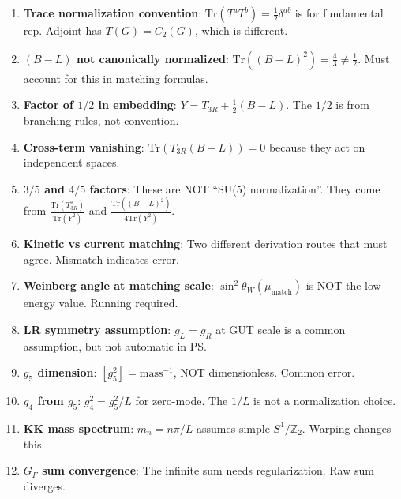 \documentclass[11pt,a4paper]{article}
\begin{document}
\begin{enumerate}[label=\textbf{Trap \arabic*}:]

\item \textbf{Trace normalization convention}:
$\mathrm{Tr}(T^a T^b) = \frac{1}{2}\delta^{ab}$ is for fundamental rep.
Adjoint has $T(G) = C_2(G)$, which is different.

\item \textbf{$(B-L)$ not canonically normalized}:
$\mathrm{Tr}((B-L)^2) = \frac{4}{3} \neq \frac{1}{2}$. Must account for this
in matching formulas.

\item \textbf{Factor of $1/2$ in embedding}:
$Y = T_{3R} + \frac{1}{2}(B-L)$. The $1/2$ is from branching rules, not convention.

\item \textbf{Cross-term vanishing}:
$\mathrm{Tr}(T_{3R} (B-L)) = 0$ because they act on independent spaces.

\item \textbf{$3/5$ and $4/5$ factors}:
These are NOT ``SU(5) normalization''. They come from
$\frac{\mathrm{Tr}(T_{3R}^2)}{\mathrm{Tr}(Y^2)}$ and $\frac{\mathrm{Tr}((B-L)^2)}{4\mathrm{Tr}(Y^2)}$.

\item \textbf{Kinetic vs current matching}:
Two different derivation routes that must agree. Mismatch indicates error.

\item \textbf{Weinberg angle at matching scale}:
$\sin^2\theta_W(\mu_{\text{match}})$ is NOT the low-energy value. Running required.

\item \textbf{LR symmetry assumption}:
$g_L = g_R$ at GUT scale is a common assumption, but not automatic in PS.

\item \textbf{$g_5$ dimension}:
$[g_5^2] = \text{mass}^{-1}$, NOT dimensionless. Common error.

\item \textbf{$g_4$ from $g_5$}:
$g_4^2 = g_5^2 / L$ for zero-mode. The $1/L$ is not a normalization choice.

\item \textbf{KK mass spectrum}:
$m_n = n\pi/L$ assumes simple $S^1/\mathbb{Z}_2$. Warping changes this.

\item \textbf{$G_F$ sum convergence}:
The infinite sum needs regularization. Raw sum diverges.


\end{enumerate}
\end{document}
